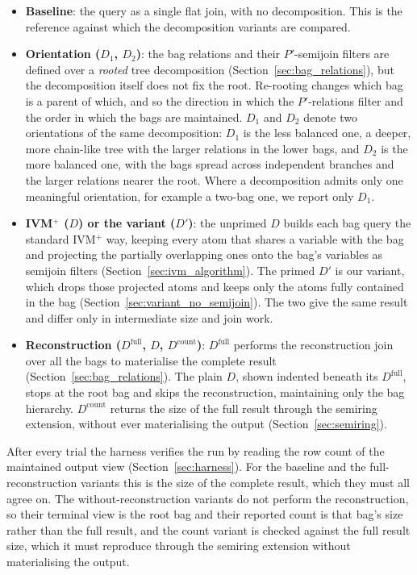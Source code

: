 \begin{itemize}
    \item \textbf{Baseline}: the query as a single flat join, with no decomposition. This is the reference against which the decomposition variants are compared.
    \item \textbf{Orientation ($D_1$, $D_2$)}: the bag relations and their $P'$-semijoin filters are defined over a \emph{rooted} tree decomposition (Section~\ref{sec:bag_relations}), but the decomposition itself does not fix the root. Re-rooting changes which bag is a parent of which, and so the direction in which the $P'$-relations filter and the order in which the bags are maintained. $D_1$ and $D_2$ denote two orientations of the same decomposition: $D_1$ is the less balanced one, a deeper, more chain-like tree with the larger relations in the lower bags, and $D_2$ is the more balanced one, with the bags spread across independent branches and the larger relations nearer the root. Where a decomposition admits only one meaningful orientation, for example a two-bag one, we report only $D_1$.
    \item \textbf{IVM$^+$ ($D$) or the variant ($D'$)}: the unprimed $D$ builds each bag query the standard IVM$^+$ way, keeping every atom that shares a variable with the bag and projecting the partially overlapping ones onto the bag's variables as semijoin filters (Section~\ref{sec:ivm_algorithm}). The primed $D'$ is our variant, which drops those projected atoms and keeps only the atoms fully contained in the bag (Section~\ref{sec:variant_no_semijoin}). The two give the same result and differ only in intermediate size and join work.
    \item \textbf{Reconstruction ($D^{\text{full}}$, $D$, $D^{\text{count}}$)}: $D^{\text{full}}$ performs the reconstruction join over all the bags to materialise the complete result (Section~\ref{sec:bag_relations}). The plain $D$, shown indented beneath its $D^{\text{full}}$, stops at the root bag and skips the reconstruction, maintaining only the bag hierarchy. $D^{\text{count}}$ returns the size of the full result through the semiring extension, without ever materialising the output (Section~\ref{sec:semiring}).
\end{itemize}

After every trial the harness verifies the run by reading the row count of the maintained output view (Section~\ref{sec:harness}). For the baseline and the full-reconstruction variants this is the size of the complete result, which they must all agree on. The without-reconstruction variants do not perform the reconstruction, so their terminal view is the root bag and their reported count is that bag's size rather than the full result, and the count variant is checked against the full result size, which it must reproduce through the semiring extension without materialising the output.

